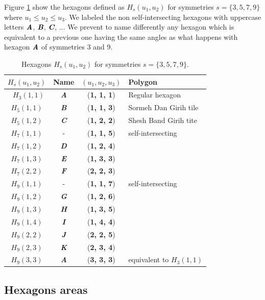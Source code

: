 \documentclass[11pt]{article}
\def\mathbi#1{\textbf{\em #1}}
\begin{document}
Figure \ref{tbl:hexagons-angles} show the hexagons defined as $H_s(u_1,u_2)$ for symmetries $s = \{3,5,7,9\}$ where $u_1 \leq u_2 \leq u_3$. We labeled the non self-intersecting hexagons with uppercase letters $\mathbi{A}$, $\mathbi{B}$, $\mathbi{C}$, ... We prevent to name differently any hexagon which is equivalent to a previous one having the same angles as what happens with hexagon $\mathbi{A}$ of symmetries $3$ and $9$.

\begin{table}[H]
\begin{center}
\begin{tabular}{| c | c | c | l | }
\hline
$H_s(u_1,u_2)$ & Name & $(u_1, u_2, u_3)$ & Polygon \\ \hline\
$H_3(1,1)$ & \mathbi{A} & (\textbf{1, 1, 1}) & Regular hexagon \\[0.5ex]
\hline
$H_5(1,1)$ & \mathbi{B} & (\textbf{1, 1, 3}) & Sormeh Dan Girih tile\\[0.5ex]
$H_5(1,2)$ & \mathbi{C} & (\textbf{1, 2, 2}) & Shesh Band Girih tite\\[0.5ex]
\hline
$H_7(1,1)$ & -          & (\textbf{1, 1, 5}) & self-intersecting \\[0.5ex]
$H_7(1,2)$ & \mathbi{D} & (\textbf{1, 2, 4}) & \\[0.5ex]
$H_7(1,3)$ & \mathbi{E} & (\textbf{1, 3, 3}) & \\[0.5ex]
$H_7(2,2)$ & \mathbi{F} & (\textbf{2, 2, 3}) & \\[0.5ex]
\hline
$H_9(1,1)$ & -          & (\textbf{1, 1, 7}) & self-intersecting \\[0.5ex]
$H_9(1,2)$ & \mathbi{G} & (\textbf{1, 2, 6}) & \\[0.5ex]
$H_9(1,3)$ & \mathbi{H} & (\textbf{1, 3, 5}) & \\[0.5ex]
$H_9(1,4)$ & \mathbi{I} & (\textbf{1, 4, 4}) & \\[0.5ex]
$H_9(2,2)$ & \mathbi{J} & (\textbf{2, 2, 5}) & \\[0.5ex]
$H_9(2,3)$ & \mathbi{K} & (\textbf{2, 3, 4}) & \\[0.5ex]
$H_9(3,3)$ & \mathbi{A} & (\textbf{3, 3, 3}) & equivalent to $H_3(1,1)$\\[1.1ex]
\hline
\end{tabular}
\caption{Hexagons $H_s(u_1,u_2)$ for symmetries $s = \{3,5,7,9\}$.} 
\label{tbl:hexagons-angles}
\end{center}
\end{table}


\subsection{Hexagons areas}
\end{document}
